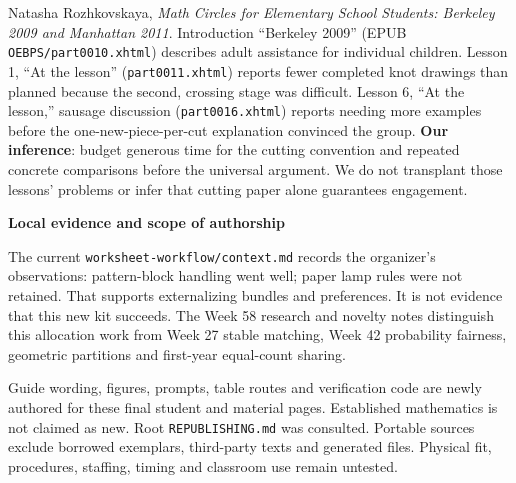 \documentclass[11pt]{article}
\newcommand{\subhead}[1]{\par\vspace{1mm}\textbf{#1}\par}
\begin{document}
Natasha Rozhkovskaya, \emph{Math Circles for Elementary School Students: Berkeley 2009 and Manhattan 2011}. Introduction ``Berkeley 2009'' (EPUB \texttt{OEBPS/part0010.xhtml}) describes adult assistance for individual children. Lesson 1, ``At the lesson'' (\texttt{part0011.xhtml}) reports fewer completed knot drawings than planned because the second, crossing stage was difficult. Lesson 6, ``At the lesson,'' sausage discussion (\texttt{part0016.xhtml}) reports needing more examples before the one-new-piece-per-cut explanation convinced the group. \textbf{Our inference}: budget generous time for the cutting convention and repeated concrete comparisons before the universal argument. We do not transplant those lessons' problems or infer that cutting paper alone guarantees engagement.

\subhead{Local evidence and scope of authorship}
The current \texttt{worksheet-workflow/context.md} records the organizer's observations: pattern-block handling went well; paper lamp rules were not retained. That supports externalizing bundles and preferences. It is not evidence that this new kit succeeds. The Week 58 research and novelty notes distinguish this allocation work from Week 27 stable matching, Week 42 probability fairness, geometric partitions and first-year equal-count sharing.

Guide wording, figures, prompts, table routes and verification code are newly authored for these final student and material pages. Established mathematics is not claimed as new. Root \texttt{REPUBLISHING.md} was consulted. Portable sources exclude borrowed exemplars, third-party texts and generated files. Physical fit, procedures, staffing, timing and classroom use remain untested.
\end{document}
